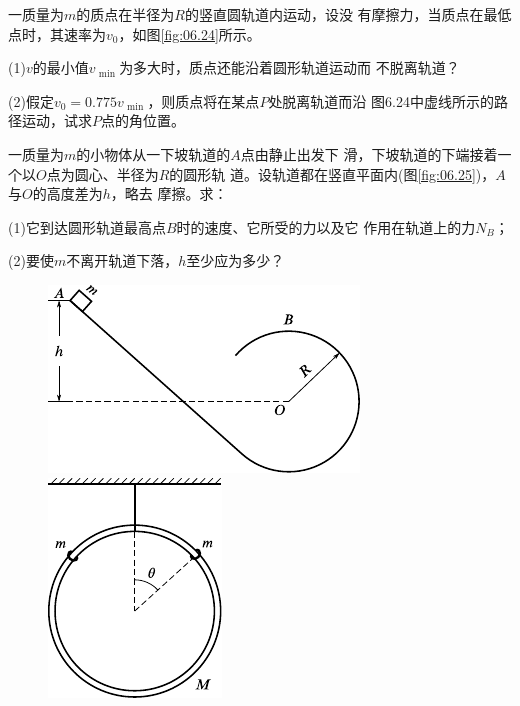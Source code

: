 \begin{exercises}
\exercise 一质量为$ m $的质点在半径为$ R $的竖直圆轨道内运动，设没
有摩擦力，当质点在最低点时，其速率为$ v_ 0 $，如图\ref{fig:06.24}\;所示。

(1)\;$ v $的最小值$ v _ { \text { min } } $为多大时，质点还能沿着圆形轨道运动而
不脱离轨道？

(2)假定$ v _ { 0 } = 0.775 v _ { \text { min } } $，则质点将在某点$ P $处脱离轨道而沿
图6.24中虚线所示的路径运动，试求$ P $点的角位置。

\exercise 一质量为$ m $的小物体从一下坡轨道的$ A $点由静止出发下
滑，下坡轨道的下端接着一个以$ O $点为圆心、半径为$ R $的圆形轨
道。设轨道都在竖直平面内(图\ref{fig:06.25})，$ A $与$ O $的高度差为$ h $，略去
摩擦。求：

(1)它到达圆形轨道最高点$ B $时的速度、它所受的力以及它
作用在轨道上的力$ N _ { B } $；

(2)要使$ m $不离开轨道下落，$ h $至少应为多少？

\begin{figure}[h]
  \begin{minipage}[b]{0.63\linewidth}
    \centering
    \includegraphics{figure/fig06.25}
    \caption{}
    \label{fig:06.25}
  \end{minipage}
  \begin{minipage}[b]{0.35\linewidth}
    \centering
    \includegraphics{figure/fig06.26}
    \caption{}
    \label{fig:06.26}
  \end{minipage}
\end{figure}


\end{exercises}
